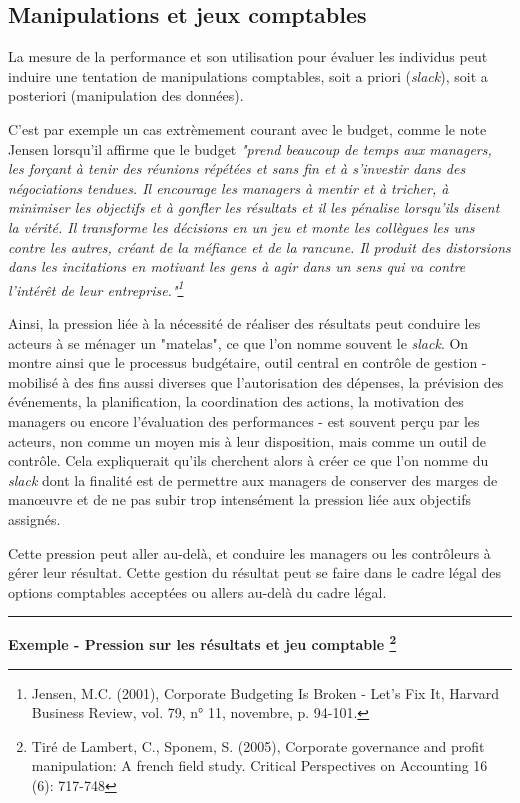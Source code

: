 \documentclass[oneside]{kaobook}
\begin{document}
\subsection{Manipulations et jeux comptables}
\label{sec:orgea91b74}
La mesure de la performance et son utilisation pour évaluer les individus peut induire une tentation de manipulations comptables, soit a priori (\emph{slack}), soit a posteriori (manipulation des données).

C'est par exemple un cas extrèmement courant avec le budget, comme le note Jensen lorsqu'il affirme que le budget \emph{"prend beaucoup de temps aux managers, les forçant à tenir des réunions répétées et sans fin et à s'investir dans des négociations tendues. Il encourage les managers à mentir et à tricher, à minimiser les objectifs et à gonfler les résultats et il les pénalise lorsqu'ils disent la vérité. Il transforme les décisions en un jeu et monte les collègues les uns contre les autres, créant de la méfiance et de la rancune. Il produit des distorsions dans les incitations en motivant les gens à agir dans un sens qui va contre l'intérêt de leur entreprise."\footnote{Jensen, M.C. (2001), Corporate Budgeting Is Broken - Let's Fix It, Harvard Business Review, vol. 79, n° 11, novembre, p. 94-101.}}

Ainsi, la pression liée à la nécessité de réaliser des résultats peut conduire les acteurs à se ménager un "matelas", ce que l’on nomme souvent le \emph{slack}. On montre ainsi que le processus budgétaire, outil central en contrôle de gestion - mobilisé à des fins aussi diverses que l’autorisation des dépenses, la prévision des événements, la planification, la coordination des actions, la motivation des managers ou encore l’évaluation des performances - est souvent perçu par les acteurs, non comme un moyen mis à leur disposition, mais comme un outil de contrôle. Cela expliquerait qu’ils cherchent alors à créer ce que l’on nomme du \emph{slack} dont la finalité est de permettre aux managers de conserver des marges de manœuvre et de ne pas subir trop intensément la pression liée aux objectifs assignés.

Cette pression peut aller au-delà, et conduire les managers ou les contrôleurs à gérer leur résultat. Cette gestion du résultat peut se faire dans le cadre légal des options comptables acceptées ou allers au-delà du cadre légal.

\noindent\rule{\textwidth}{0.5pt}
\textbf{Exemple - Pression sur les résultats et jeu comptable \footnote{Tiré de Lambert, C., Sponem, S. (2005), Corporate governance and profit manipulation: A french field study. Critical Perspectives on Accounting 16 (6): 717-748}}
\end{document}
